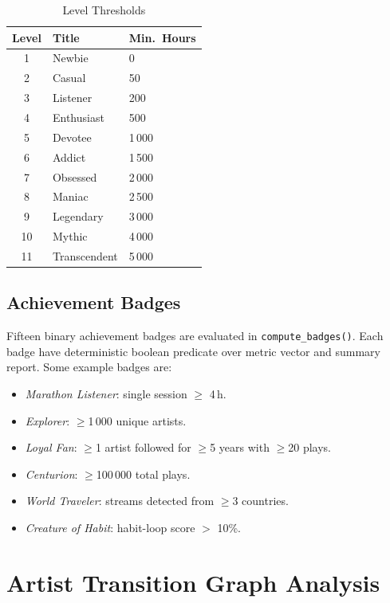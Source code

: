 \documentclass[conference]{IEEEtran}
\newcommand{\tabletight}{\footnotesize\setlength{\tabcolsep}{3.5pt}\renewcommand{\arraystretch}{1.08}}
\begin{document}
\begin{table}[!t]
\caption{Level Thresholds}
\label{tab:levels}
\centering
\tabletight
\begin{tabular}{cll}
\toprule
\textbf{Level} & \textbf{Title} & \textbf{Min.\ Hours} \\
\midrule
1  & Newbie       & 0 \\
2  & Casual       & 50 \\
3  & Listener     & 200 \\
4  & Enthusiast   & 500 \\
5  & Devotee      & 1\,000 \\
6  & Addict       & 1\,500 \\
7  & Obsessed     & 2\,000 \\
8  & Maniac       & 2\,500 \\
9  & Legendary    & 3\,000 \\
10 & Mythic       & 4\,000 \\
11 & Transcendent & 5\,000 \\
\bottomrule
\end{tabular}
\end{table}

\subsection{Achievement Badges}

Fifteen binary achievement badges are evaluated in \texttt{compute\_badges()}. Each badge have deterministic boolean predicate over metric vector and summary report. Some example badges are:
\begin{itemize}
  \item \textit{Marathon Listener}: single session $\geq$ 4\,h.
  \item \textit{Explorer}: $\geq$1\,000 unique artists.
  \item \textit{Loyal Fan}: $\geq$1 artist followed for $\geq$5 years with
        $\geq$20 plays.
  \item \textit{Centurion}: $\geq$100\,000 total plays.
  \item \textit{World Traveler}: streams detected from $\geq$3 countries.
  \item \textit{Creature of Habit}: habit-loop score $>$ 10\%.
\end{itemize}

\section{Artist Transition Graph Analysis}
\end{document}
